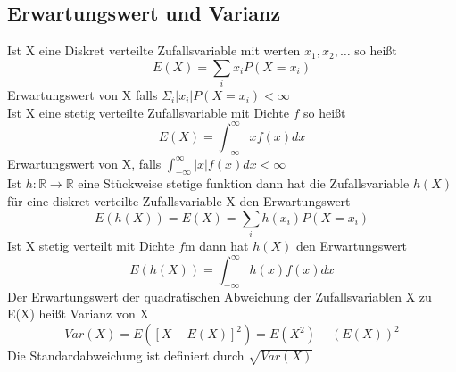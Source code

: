 \documentclass[
	ngerman,
	accentcolor=9c,%
	type=intern,
	marginpar=false
	]{tudapub}
\begin{document}
        \subsection{Erwartungswert und Varianz}
            Ist X eine Diskret verteilte Zufallsvariable mit werten $x_1, x_2, \dots$ so heißt
            \begin{equation*}
                E(X) = \sum_i x_i P(X=x_i)
            \end{equation*}
            Erwartungswert von X falls $\Sigma_i |x_i| P(X=x_i) < \infty$\\
            Ist X eine stetig verteilte Zufallsvariable mit Dichte $f$ so heißt
            \begin{equation*}
                E(X) = \int_{-\infty}^\infty x f(x) dx 
            \end{equation*}
            Erwartungswert von X, falls $\int_{-\infty}^\infty |x| f(x) dx < \infty$\\
            Ist $h: \mathbb{R} \rightarrow \mathbb{R}$ eine Stückweise stetige funktion dann hat die Zufallsvariable $h(X)$
            für eine diskret verteilte Zufallsvariable X den Erwartungswert
            \begin{equation*}
                E(h(X)) = E(X) = \sum_i h(x_i) P(X=x_i)
            \end{equation*}
            Ist X stetig verteilt mit Dichte $f$m dann hat $h(X)$ den Erwartungswert
            \begin{equation*}
                E(h(X)) = \int_{-\infty}^\infty h(x) f(x) dx 
            \end{equation*}
            Der Erwartungswert  der quadratischen Abweichung der Zufallsvariablen X zu E(X) heißt Varianz von X
            \begin{equation*}
                Var(X) = E([X- E(X)]^2) = E(X^2) - (E(X))^2
            \end{equation*}
            Die Standardabweichung ist definiert durch $\sqrt{Var(X)}$
\end{document}
